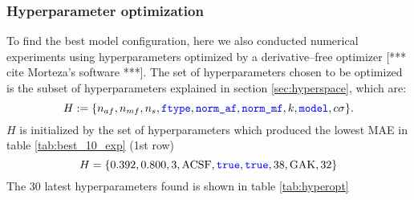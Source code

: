 \documentclass[12pt]{article}
\def\att{                    %
        \marginpar[ \hspace*{\fill} \raisebox{-0.2em}{\rule{2mm}{1.2em}} ]
        {\raisebox{-0.2em}{\rule{2mm}{1.2em}} }
        }
\def\at#1{[*** \att #1 ***]}  %
\begin{document}
\subsubsection{Hyperparameter optimization}
To find the best model configuration, here we also conducted numerical experiments using hyperparameters optimized by a derivative--free optimizer \at{cite Morteza's software}. The set of hyperparameters chosen to be optimized is the subset of hyperparameters explained in section \ref{sec:hyperspace}, which are:
\begin{equation*}
	H := \{n_{af}, n_{mf}, n_s, \codeword{ftype}, \codeword{norm_af}, \codeword{norm_mf}, k, \codeword{model}, c\sigma\}.
\end{equation*}
$H$ is initialized by the set of hyperparameters which produced the lowest MAE in table \ref{tab:best_10_exp} (1st row)
\begin{equation*}
	H = \{0.392, 0.800, 3, \text{ACSF}, \codeword{true}, \codeword{true}, 38, \text{GAK}, 32\}
\end{equation*}
The 30 latest hyperparameters found is shown in table \ref{tab:hyperopt}
\end{document}

